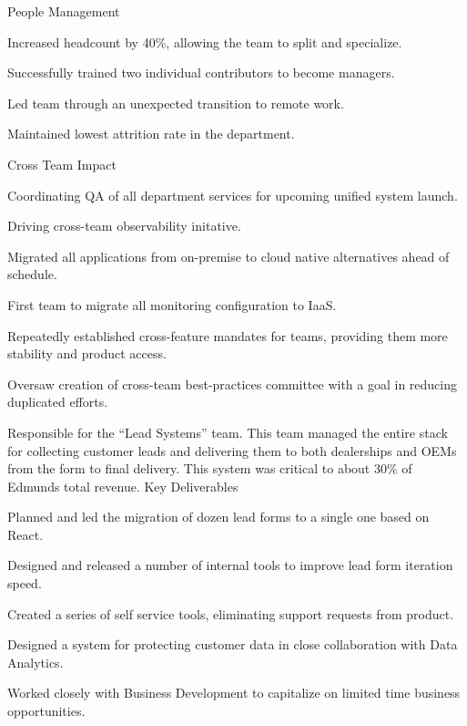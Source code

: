\documentclass[]{deedy-resume-openfont}
\begin{document}
\sectionsep
People Management
\begin{tightemize}
\item Increased headcount by 40\%, allowing the team to split and specialize.
\item Successfully trained two individual contributors to become managers.
\item Led team through an unexpected transition to remote work.
\item Maintained lowest attrition rate in the department.
\end{tightemize}
\sectionsep
Cross Team Impact
\begin{tightemize}
\item Coordinating QA of all department services for upcoming unified system launch.
\item Driving cross-team observability initative.
\item Migrated all applications from on-premise to cloud native alternatives ahead of schedule.
\item First team to migrate all monitoring configuration to IaaS.
\item Repeatedly established cross-feature mandates for teams, providing them more stability and product access.
\item Oversaw creation of cross-team best-practices committee with a goal in reducing duplicated efforts.
\end{tightemize}
\sectionsep

\vspace{\topsep}
Responsible for the ``Lead Systems'' team. This team managed the entire stack for collecting customer leads and delivering them to both dealerships and OEMs from the form to final delivery. This system was critical to about 30\% of Edmunds total revenue.
\vspace{\topsep}
Key Deliverables
\begin{tightemize}
\item Planned and led the migration of dozen lead forms to a single one based on React.
\item Designed and released a number of internal tools to improve lead form iteration speed.
\item Created a series of self service tools, eliminating support requests from product.
\item Designed a system for protecting customer data in close collaboration with Data Analytics.
\item Worked closely with Business Development to capitalize on limited time business opportunities.
\end{tightemize}
\end{document}
